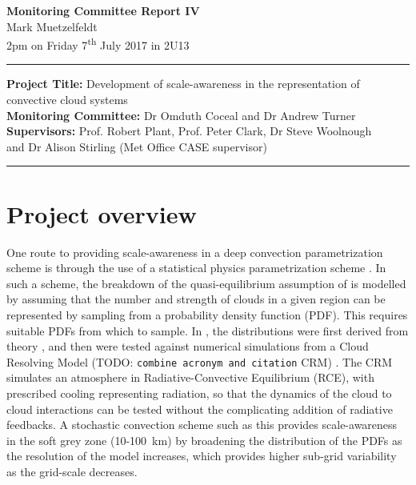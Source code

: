 \documentclass[11pt,a4paper]{article}
\newcommand{\ts}{\textsuperscript}
\newcommand{\todo}{TODO: \texttt}
\begin{document}

\begin{center}
    \Large{\textbf{Monitoring Committee Report IV}}\\[0.1cm]
    \large{Mark Muetzelfeldt}\\
    \normalsize{2pm on Friday 7\ts{th} July 2017 in 2U13}\\[0.1cm]		
    \rule{\textwidth}{0.2mm}
    \textbf{Project Title: }Development of scale-awareness in the representation of
    convective cloud systems\\
    \textbf{Monitoring Committee: }Dr Omduth Coceal and  Dr Andrew Turner\\
    \textbf{Supervisors: }Prof. Robert Plant, Prof. Peter Clark, Dr Steve Woolnough \\
    and Dr Alison Stirling (Met Office CASE supervisor)\\
    \rule{\textwidth}{0.2mm}
\end{center}

\section{Project overview}
\label{sec:Project Overview}

One route to providing scale-awareness in a deep convection parametrization scheme is through the use of a statistical physics parametrization scheme \parencite{plant2008stochastic}. In such a scheme, the breakdown of the quasi-equilibrium assumption of \cite{arakawa1974interaction} is modelled by assuming that the number and strength of clouds in a given region can be represented by sampling from a probability density function (PDF). This requires suitable PDFs from which to sample. In \cite{plant2008stochastic}, the distributions were first derived from theory \parencite{craig2006fluctuations}, and then were tested against numerical simulations from a Cloud Resolving Model (\todo{combine acronym and citation} CRM) \parencite{cohen2006fluctuations}. The CRM simulates an atmosphere in Radiative-Convective Equilibrium (RCE), with prescribed cooling representing radiation, so that the dynamics of the cloud to cloud interactions can be tested without the complicating addition of radiative feedbacks. A stochastic convection scheme such as this provides scale-awareness in the soft grey zone (\SI{10}{}-\SI{100}{km}) by broadening the distribution of the PDFs as the resolution of the model increases, which provides higher sub-grid variability as the grid-scale decreases.
\end{document}
